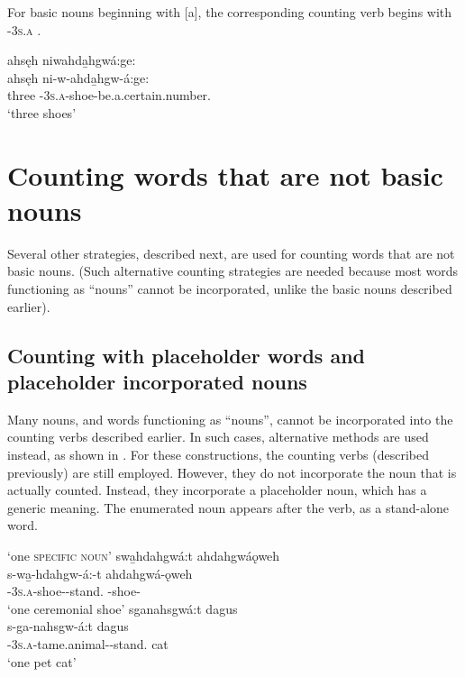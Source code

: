 For basic nouns beginning with [a], the corresponding counting verb begins with  \textsc{\partitive-3s.a} .

\newpage
\ea\label{ex:countingex16}
ahsęh niwahda̱hgwá:ge:\\
\gll ahsęh ni-w-ahda̱hgw-á:ge:\\
three {\partitive}-\textsc{3s.a}-shoe-be.a.certain.number.{\stative}\\
\glt `three shoes'
\z



\section{Counting words that are not basic nouns} \label{ch:Counting words that are not basic nouns}
Several other strategies, described next, are used for counting words that are not basic nouns. (Such alternative counting strategies are needed because most words functioning as “nouns” cannot be incorporated, unlike the basic nouns described earlier).


\subsection{Counting with placeholder words and placeholder incorporated nouns} \label{ch:Counting with placeholder words and placeholder incorporated nouns}
Many nouns, and words functioning as “nouns”, cannot be incorporated into the counting verbs described earlier. In such cases, alternative methods are used instead, as shown in . For these constructions, the counting verbs (described previously) are still employed. However, they do not incorporate the noun that is actually counted. Instead, they incorporate a placeholder noun, which has a generic meaning. The enumerated noun appears after the verb, as a stand-alone word.

\ea\label{ex:countplaceholdex8}  ‘one \textsc{specific noun}’
\ea swa̱hdahgwá:t ahdahgwáǫweh\\
\gll s-wa̱-hdahgw-á:-t ahdahgwá-ǫweh\\
 {\repetitive}-\textsc{3s.a}-shoe-{\joinerA}-stand.{\stative}  {\noprefix}-shoe-{\typicalizer}\\
\glt `one ceremonial shoe'
\ex sganahsgwá:t dagus\\
\gll s-ga-nahsgw-á:t dagus\\
 {\repetitive}-\textsc{3s.a}-tame.animal-{\joinerA}-stand.{\stative} cat\\
\glt `one pet cat'
\z
\z

